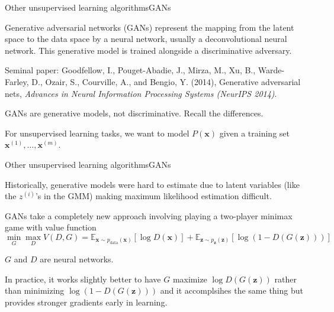 \documentclass{beamer}
\begin{document}
\begin{frame}{Other unsupervised learning algorithms}{GANs}

  \alert{Generative adversarial networks} (GANs) represent the
  mapping from the latent space to the data space by a neural network,
  usually a deconvolutional neural network. This generative model is
  trained alongside a discriminative adversary.

  \medskip

  Seminal paper: Goodfellow, I., Pouget-Abadie, J., Mirza, M., Xu, B.,
  Warde-Farley, D., Ozair, S., Courville, A., and Bengio, Y. (2014),
  Generative adversarial nets, \textit{Advances in Neural Information
  Processing Systems (NeurIPS 2014)}.

  \medskip

  GANs are \alert{generative} models, not discriminative. Recall the
  differences.

  \medskip

  For unsupervised learning tasks, we want to model
  $P(\mathbf{x})$ given a training set
  $\mathbf{x}^{(1)},\ldots,\mathbf{x}^{(m)}$.

\end{frame}


\begin{frame}{Other unsupervised learning algorithms}{GANs}

  Historically, generative models were hard to estimate due to latent
  variables (like the $z^{(i)}$'s in the GMM) making maximum likelihood
  estimation difficult.

  \medskip

  GANs take a completely new approach
  involving playing a two-player minimax game with value function
  \[ \min_G \max_D V(D,G) = \mathbb{E}_{\mathbf{x} \sim p_\text{data}(\mathbf{x})}  [ \log D(\mathbf{x}) ] + \mathbb{E}_{\mathbf{z} \sim p_\mathbf{z}(\mathbf{z})} [ \log(1 - D(G(\mathbf{z})))]
  \]

  \medskip

  $G$ and $D$ are neural networks.

  \medskip

  In practice, it works slightly better to have
  $G$ maximize $\log D(G(\mathbf{z}))$ rather than minimizing
  $\log (1-D(G(\mathbf{z})))$ and it accomplsihes the same thing
  but provides stronger gradients early in learning.

\end{frame}
\end{document}
